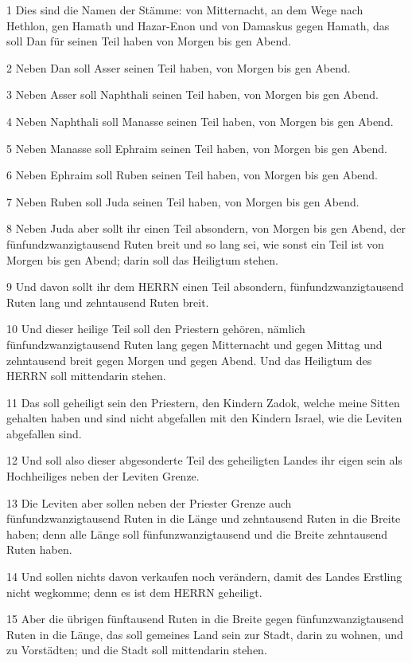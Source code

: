 \par 1 Dies sind die Namen der Stämme: von Mitternacht, an dem Wege nach Hethlon, gen Hamath und Hazar-Enon und von Damaskus gegen Hamath, das soll Dan für seinen Teil haben von Morgen bis gen Abend.
\par 2 Neben Dan soll Asser seinen Teil haben, von Morgen bis gen Abend.
\par 3 Neben Asser soll Naphthali seinen Teil haben, von Morgen bis gen Abend.
\par 4 Neben Naphthali soll Manasse seinen Teil haben, von Morgen bis gen Abend.
\par 5 Neben Manasse soll Ephraim seinen Teil haben, von Morgen bis gen Abend.
\par 6 Neben Ephraim soll Ruben seinen Teil haben, von Morgen bis gen Abend.
\par 7 Neben Ruben soll Juda seinen Teil haben, von Morgen bis gen Abend.
\par 8 Neben Juda aber sollt ihr einen Teil absondern, von Morgen bis gen Abend, der fünfundzwanzigtausend Ruten breit und so lang sei, wie sonst ein Teil ist von Morgen bis gen Abend; darin soll das Heiligtum stehen.
\par 9 Und davon sollt ihr dem HERRN einen Teil absondern, fünfundzwanzigtausend Ruten lang und zehntausend Ruten breit.
\par 10 Und dieser heilige Teil soll den Priestern gehören, nämlich fünfundzwanzigtausend Ruten lang gegen Mitternacht und gegen Mittag und zehntausend breit gegen Morgen und gegen Abend. Und das Heiligtum des HERRN soll mittendarin stehen.
\par 11 Das soll geheiligt sein den Priestern, den Kindern Zadok, welche meine Sitten gehalten haben und sind nicht abgefallen mit den Kindern Israel, wie die Leviten abgefallen sind.
\par 12 Und soll also dieser abgesonderte Teil des geheiligten Landes ihr eigen sein als Hochheiliges neben der Leviten Grenze.
\par 13 Die Leviten aber sollen neben der Priester Grenze auch fünfundzwanzigtausend Ruten in die Länge und zehntausend Ruten in die Breite haben; denn alle Länge soll fünfunzwanzigtausend und die Breite zehntausend Ruten haben.
\par 14 Und sollen nichts davon verkaufen noch verändern, damit des Landes Erstling nicht wegkomme; denn es ist dem HERRN geheiligt.
\par 15 Aber die übrigen fünftausend Ruten in die Breite gegen fünfunzwanzigtausend Ruten in die Länge, das soll gemeines Land sein zur Stadt, darin zu wohnen, und zu Vorstädten; und die Stadt soll mittendarin stehen.
